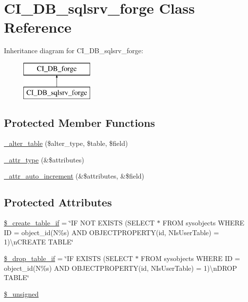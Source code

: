 \hypertarget{class_c_i___d_b__sqlsrv__forge}{}\section{C\+I\+\_\+\+D\+B\+\_\+sqlsrv\+\_\+forge Class Reference}
\label{class_c_i___d_b__sqlsrv__forge}
Inheritance diagram for C\+I\+\_\+\+D\+B\+\_\+sqlsrv\+\_\+forge\+:\begin{figure}[H]
\begin{center}
\leavevmode
\includegraphics[height=2.000000cm]{class_c_i___d_b__sqlsrv__forge}
\end{center}
\end{figure}
\subsection*{Protected Member Functions}
\begin{DoxyCompactItemize}
\item 
\mbox{\hyperlink{class_c_i___d_b__sqlsrv__forge_a41c6cae02f2fda8b429ad0afb9509426}{\+\_\+alter\+\_\+table}} (\$alter\+\_\+type, \$table, \$field)
\item 
\mbox{\hyperlink{class_c_i___d_b__sqlsrv__forge_a8553be952084c6f7cdfff370a1d14f6b}{\+\_\+attr\+\_\+type}} (\&\$attributes)
\item 
\mbox{\hyperlink{class_c_i___d_b__sqlsrv__forge_a2a013a5932439c3c44f0dad3436525f7}{\+\_\+attr\+\_\+auto\+\_\+increment}} (\&\$attributes, \&\$field)
\end{DoxyCompactItemize}
\subsection*{Protected Attributes}
\begin{DoxyCompactItemize}
\item 
\mbox{\hyperlink{class_c_i___d_b__sqlsrv__forge_a2f6484fcb8d1dc3eef67a637227cd583}{\$\+\_\+create\+\_\+table\+\_\+if}} = \char`\"{}IF N\+OT E\+X\+I\+S\+TS (S\+E\+L\+E\+CT $\ast$ F\+R\+OM sysobjects W\+H\+E\+RE ID = object\+\_\+id(N\textquotesingle{}\%s\textquotesingle{}) A\+ND O\+B\+J\+E\+C\+T\+P\+R\+O\+P\+E\+R\+TY(id, N\textquotesingle{}Is\+User\+Table\textquotesingle{}) = 1)\textbackslash{}n\+C\+R\+E\+A\+TE T\+A\+B\+LE\char`\"{}
\item 
\mbox{\hyperlink{class_c_i___d_b__sqlsrv__forge_a92a8a9145a7fc91e252e58d019373581}{\$\+\_\+drop\+\_\+table\+\_\+if}} = \char`\"{}IF E\+X\+I\+S\+TS (S\+E\+L\+E\+CT $\ast$ F\+R\+OM sysobjects W\+H\+E\+RE ID = object\+\_\+id(N\textquotesingle{}\%s\textquotesingle{}) A\+ND O\+B\+J\+E\+C\+T\+P\+R\+O\+P\+E\+R\+TY(id, N\textquotesingle{}Is\+User\+Table\textquotesingle{}) = 1)\textbackslash{}n\+D\+R\+OP T\+A\+B\+LE\char`\"{}
\item 
\mbox{\hyperlink{class_c_i___d_b__sqlsrv__forge_aae977ae6d61fa183f0b25422b6ddc31c}{\$\+\_\+unsigned}}
\end{DoxyCompactItemize}
